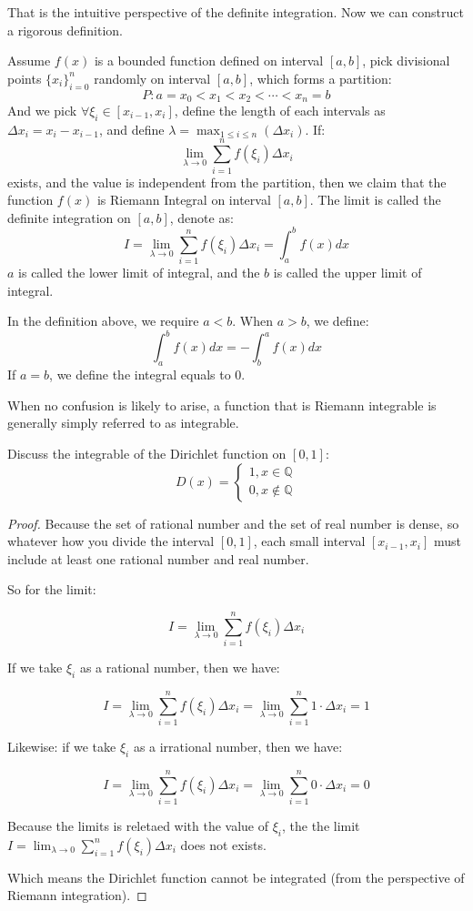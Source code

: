 \documentclass[oneside]{book}
\begin{document}
That is the intuitive perspective of the definite integration. Now we can construct a rigorous definition.

\begin{definition}
Assume $f(x)$ is a bounded function defined on interval $[a,b]$, pick divisional points $\{x_i\}^{n}_{i=0}$ randomly on interval $[a,b]$, which forms a partition:
\[
P:a=x_0<x_1<x_2< \cdots <x_n=b
\]
And we pick $\forall \xi_i \in [x_{i-1},x_i]$, define the length of each intervals as $\Delta x_i = x_i - x_{i-1}$, and define $\lambda = \max_{1 \leq i \leq n}(\Delta x_i) $. If:
\[
\lim_{\lambda \to 0} \sum_{i=1}^{n} f(\xi_i)\Delta x_i
\]
exists, and the value is independent from the partition, then we claim that the function $f(x)$ is Riemann Integral on interval $[a,b]$. The limit is called the definite integration on $[a,b]$, denote as:
\[
I = \lim_{\lambda \to 0} \sum_{i=1}^{n}f(\xi_i) \Delta x_i = \int_a^b f(x) dx
\]
$a$ is called the lower limit of integral, and the $b$ is called the upper limit of integral.
\end{definition}

In the definition above, we require $a<b$. When $a>b$, we define:
\[\int_{a}^{b}f(x)dx = -\int_{b}^{a}f(x)dx\]
If $a=b$, we define the integral equals to $0$.

When no confusion is likely to arise, a function that is Riemann integrable is generally simply referred to as integrable.

\begin{example}
Discuss the integrable of the Dirichlet function on $[0,1]$:
\[D(x)=
\begin{cases}
    1,x \in \mathbb{Q} \\
    0,x \notin \mathbb{Q}
\end{cases}\]

\begin{proof}
Because the set of rational number and the set of real number is dense, so whatever how you divide the interval $[0,1]$, each small interval $[x_{i-1},x_i]$ must include at least one rational number and real number.

So for the limit:

\[I=\lim_{\lambda \to 0} \sum_{i=1}^{n} f(\xi_i)\Delta x_i\]

If we take $\xi_i$ as a rational number, then we have:

\[I = \lim_{\lambda \to 0} \sum_{i=1}^{n} f(\xi_i)\Delta x_i = \lim_{\lambda \to 0} \sum_{i=1}^{n} 1 \cdot \Delta x_i = 1\]

Likewise: if we take $\xi_i$ as a irrational number, then we have:

\[I = \lim_{\lambda \to 0} \sum_{i=1}^{n} f(\xi_i)\Delta x_i = \lim_{\lambda \to 0} \sum_{i=1}^{n} 0 \cdot \Delta x_i = 0\]

Because the limits is reletaed with the value of $\xi_i$, the the limit $I=\lim_{\lambda \to 0} \sum_{i=1}^{n} f(\xi_i)\Delta x_i$ does not exists.

Which means the Dirichlet function cannot be integrated (from the perspective of Riemann integration).

\end{proof}

\end{example}
\end{document}
